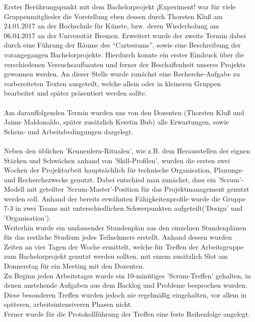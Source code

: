 \documentclass{Bericht}
\begin{document}
		Erster Berührungspunkt mit dem Bachelorprojekt ¡Experiment! war für viele Gruppenmitglieder die Vorstellung eben dessen durch Thorsten Kluß am 24.01.2017 an der Hochschule für Künste, bzw. deren Wiederholung am 06.04.2017 an der Universität Bremen. Erweitert wurde der zweite Termin dabei durch eine Führung der Räume des "`Cartesiums"', sowie eine Beschreibung der vorangegangen Bachelorprojekte. Hierdurch konnte ein erster Eindruck über die verschiedenen Versuchsaufbauten und ferner der Beschaffenheit unseres Projekts gewonnen werden. An dieser Stelle wurde zunächst eine Recherche-Aufgabe zu vorbereiteten Texten ausgeteilt, welche allein oder in kleineren Gruppen bearbeitet und später präsentiert werden sollte.\\
\\
		Am darauffolgenden Termin wurden uns von den Dozenten (Thorsten Kluß und Jaime Maldonaldo, später zusätzlich Kerstin Bub) alle Erwartungen, sowie Schein- und Arbeitsbedingungen dargelegt.\\
\\
		Neben den üblichen 'Kennenlern-Ritualen', wie z.B. dem Herausstellen der eignen Stärken und Schwächen anhand von 'Skill-Profilen', wurden die ersten zwei Wochen der Projektarbeit hauptsächlich für technische Organisation, Planungs- und Recherchezwecke genutzt. Dabei entschied man zunächst, dass ein 'Scrum'-Modell mit geteilter 'Scrum-Master'-Position für das Projektmanagement genutzt werden soll. Anhand der bereits erwähnten Fähigkeitenprofile wurde die Gruppe 7-3 in zwei Teams mit unterschiedlichen Schwerpunkten aufgeteilt('Design' und 'Organisation').\\
		Weiterhin wurde ein umfassender Stundenplan aus den einzelnen Stundenplänen für das restliche Studium jedes Teilnehmers erstellt. Anhand dessen wurden Zeiten an vier Tagen der Woche ermittelt, welche für Treffen der Arbeitsgruppe zum Bachelorprojekt genutzt werden sollten, mit einem zusätzlich Slot am Donnerstag für ein Meeting mit den Dozenten. \\
		Zu Beginn jeden Arbeitstages wurde ein 10-minütiges 'Scrum-Treffen' gehalten, in denen anstehende Aufgaben aus dem Backlog und Probleme besprochen wurden. Diese besonderen Treffen wurden jedoch nie regelmäßig eingehalten, vor allem in späteren, arbeitsintensiveren Phasen nicht.\\
		Ferner wurde für die Protokollführung der Treffen eine feste Reihenfolge angelegt.\\
\\
\end{document}
